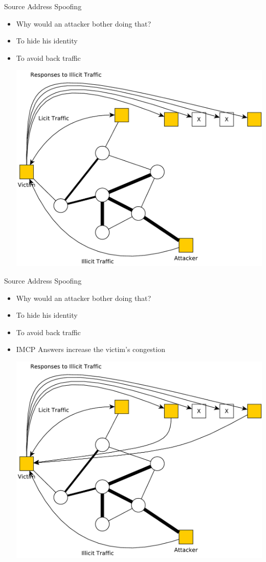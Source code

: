 \documentclass{beamer}
\begin{document}
\begin{frame}{Source Address Spoofing }
  \begin{itemize}
  \item Why would an attacker bother doing that?
  \item<2-> To hide his identity
  \item<3-> To avoid back traffic
  \begin{center}
    \includegraphics[width=0.8\linewidth]{dos2}
  \end{center}
  \end{itemize}
\end{frame}

\begin{frame}{Source Address Spoofing }
  \begin{itemize}
  \item Why would an attacker bother doing that?
  \item To hide his identity
  \item To avoid back traffic
  \item IMCP Answers increase the victim's congestion
  \begin{center}
    \includegraphics[width=0.7\linewidth]{dos3}
  \end{center}
  \end{itemize}
\end{frame}
\end{document}
